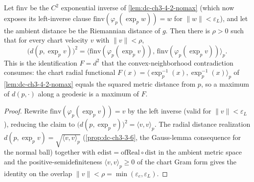 \begin{lemma}
  \label{lem:dc-ch3-4-2-bridge}


  Let $\mathrm{finv}$ be the $C^2$ exponential inverse of \cref{lem:dc-ch3-4-2-nomax} (which now
  exposes its left-inverse clause $\mathrm{finv}(\varphi_p(\exp_p w))=w$ for $\|w\|<\varepsilon_L$),
  and let the ambient distance be the Riemannian distance of $g$. Then there is $\rho>0$ such that
  for every chart velocity $v$ with $\|v\|<\rho$,
  $$ \big(d(p,\exp_p v)\big)^2 = \big\langle \mathrm{finv}(\varphi_p(\exp_p v)),\,
     \mathrm{finv}(\varphi_p(\exp_p v))\big\rangle_p . $$
  This is the identification $F=d^2$ that the convex-neighborhood contradiction consumes:
  the chart radial functional $F(x)=\langle\exp_p^{-1}(x),\exp_p^{-1}(x)\rangle_p$ of
  \cref{lem:dc-ch3-4-2-nomax} equals the squared metric distance from $p$, so a maximum of
  $d(p,\cdot)$ along a geodesic is a maximum of $F$.
\end{lemma}
\begin{proof}
  \sketch

  Rewrite $\mathrm{finv}(\varphi_p(\exp_p v))=v$ by the left inverse (valid for $\|v\|<\varepsilon_L$),
  reducing the claim to $\big(d(p,\exp_p v)\big)^2=\langle v,v\rangle_p$. The radial distance
  realization $d(p,\exp_p v)=\sqrt{\langle v,v\rangle_p}$ (\cref{prop:dc-ch3-3-6}, the Gauss-lemma
  consequence for the normal ball) together with $\mathrm{edist}=\mathrm{ofReal}\circ\mathrm{dist}$ in
  the ambient metric space and the positive-semidefiniteness $\langle v,v\rangle_p\ge0$ of the chart
  Gram form gives the identity on the overlap $\|v\|<\rho=\min(\varepsilon_e,\varepsilon_L)$.
\end{proof}

